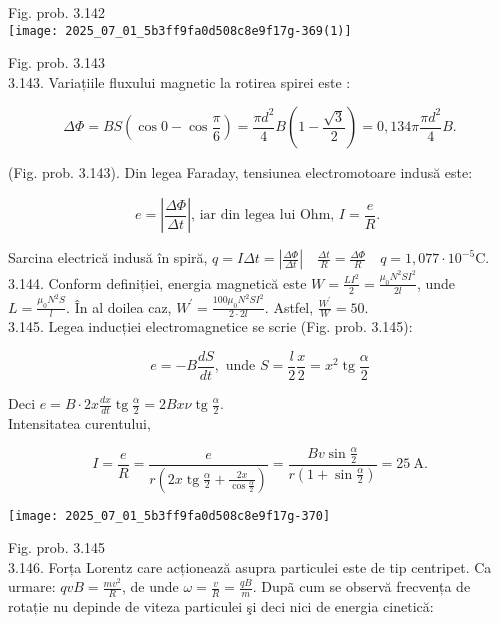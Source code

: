 Fig. prob. 3.142\\
\texttt{[image: 2025\_07\_01\_5b3ff9fa0d508c8e9f17g-369(1)]}

Fig. prob. 3.143\\
3.143. Variațiile fluxului magnetic la rotirea spirei este :

$$
\Delta \Phi=B S\left(\cos 0-\cos \frac{\pi}{6}\right)=\frac{\pi d^{2}}{4} B\left(1-\frac{\sqrt{3}}{2}\right)=0,134 \pi \frac{\pi d^{2}}{4} B .
$$

(Fig. prob. 3.143). Din legea Faraday, tensiunea electromotoare indusă este:

$$
e=\left|\frac{\Delta \Phi}{\Delta t}\right| \text {, iar din legea lui Ohm, } I=\frac{e}{R} \text {. }
$$

Sarcina electrică indusă în spiră, $q=I \Delta t=\left|\frac{\Delta \Phi}{\Delta t}\right| \quad \frac{\Delta t}{R}=\frac{\Delta \Phi}{R} \quad q=1,077 \cdot 10^{-5} \mathrm{C}$.\\
3.144. Conform definiției, energia magnetică este $W=\frac{L I^{2}}{2}=\frac{\mu_{0} N^{2} S I^{2}}{2 l}$, unde $L=\frac{\mu_{0} N^{2} S}{l}$. În al doilea caz, $W^{\prime}=\frac{100 \mu_{0} N^{2} S I^{2}}{2 \cdot 2 l}$. Astfel, $\frac{W^{\prime}}{W}=50$.\\
3.145. Legea inducției electromagnetice se scrie (Fig. prob. 3.145):

$$
e=-B \frac{d S}{d t}, \text { unde } S=\frac{l}{2} \frac{x}{2}=x^{2} \operatorname{tg} \frac{\alpha}{2}
$$

Deci $e=B \cdot 2 x \frac{d x}{d t} \operatorname{tg} \frac{\alpha}{2}=2 B x \nu \operatorname{tg} \frac{\alpha}{2}$.\\
Intensitatea curentului,

$$
I=\frac{e}{R}=\frac{e}{r\left(2 x \operatorname{tg} \frac{\alpha}{2}+\frac{2 x}{\cos \frac{\alpha}{2}}\right)}=\frac{B v \sin \frac{\alpha}{2}}{r\left(1+\sin \frac{\alpha}{2}\right)}=25 \mathrm{~A} .
$$

\begin{center}
\texttt{[image: 2025\_07\_01\_5b3ff9fa0d508c8e9f17g-370]}
\end{center}

Fig. prob. 3.145\\
3.146. Forța Lorentz care acționează asupra particulei este de tip centripet. Ca urmare: $q v B=\frac{m v^{2}}{R}$, de unde $\omega=\frac{v}{R}=\frac{q B}{m}$. Dupã cum se observă frecvența de rotație nu depinde de viteza particulei şi deci nici de energia cinetică:

